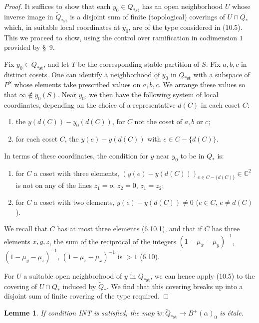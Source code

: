 \documentclass[12pt,a4paper]{article}
\theoremstyle{plain}
\newtheorem{lemma}[theorem]{Lemme}
\theoremstyle{definition}
\theoremstyle{remark}
\begin{document}
\begin{proof}
It suffices to show that each $y_0 \in Q_{*\text{st}}$ has an open neighborhood $U$ whose inverse image in $\widetilde{Q}_{*\text{st}}$ is a disjoint sum of finite (topological) coverings of $U \cap Q_*$ which, in suitable local coordinates at $y_0$, are of the type considered in (10.5). This we proceed to show, using the control over ramification in codimension $1$ provided by \S\ 9.

Fix $y_0 \in Q_{*\text{st}}$, and let $T$ be the corresponding stable partition of $S$. Fix $a, b, c$ in distinct cosets. One can identify a neighborhood of $y_0$ in $Q_{*\text{st}}$ with a subspace of $P^S$ whose elements take prescribed values on $a, b, c$. We arrange these values so that $\infty \notin y_0(S)$. Near $y_0$, we then have the following system of local coordinates, depending on the choice of a representative $d(C)$ in each coset $C$:
\begin{enumerate}
\item[a)] the $y(d(C)) - y_0(d(C))$, for $C$ not the coset of $a, b$ or $c$;
\item[b)] for each coset $C$, the $y(e) - y(d(C))$ with $e \in C - \{d(C)\}$.
\end{enumerate}

In terms of these coordinates, the condition for $y$ near $y_0$ to be in $Q_*$ is:
\begin{enumerate}
\item[a)] for $C$ a coset with three elements, $(y(e) - y(d(C)))_{e \in C - \{d(C)\}} \in \mathbb{C}^2$ is not on any of the lines $z_1 = o$, $z_2 = 0$, $z_1 = z_2$;
\item[b)] for $C$ a coset with two elements, $y(e) - y(d(C)) \neq 0$ ($e \in C$, $e \neq d(C)$).
\end{enumerate}
We recall that $C$ has at most three elements (6.10.1), and that if $C$ has three elements $x, y, z$, the sum of the reciprocal of the integers $(1 - \mu_x - \mu_y)^{-1}$, $(1 - \mu_y - \mu_z)^{-1}$, $(1 - \mu_z - \mu_x)^{-1}$ is $> 1$ (6.10).

For $U$ a suitable open neighborhood of $y$ in $Q_{*\text{st}}$, we can hence apply (10.5) to the covering of $U \cap Q_*$ induced by $\widetilde{Q}_*$. We find that this covering breaks up into a disjoint sum of finite covering of the type required.
\end{proof}

\begin{lemma}
\label{10.7}
If condition INT is satisfied, the map $\widetilde{w} : \widetilde{Q}_{*\text{st}} \to B^+(\alpha)_0$ is \'etale.
\end{lemma}
\end{document}
